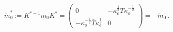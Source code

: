 \begin{equation}
\tilde{m}_{0}^{\ast }:=K^{\ast -1}m_{0}K^{\ast }=\left( 
\begin{array}{cc}
0 & -\kappa _{e}^{\frac{1}{2}}T\kappa _{o}^{-{\frac{1}{2}}} \\ 
-\kappa _{o}^{-{\frac{1}{2}}}\bar{T}\kappa _{e}^{\frac{1}{2}} & 0
\end{array}
\right) =-\tilde{m}_{0}\,.  \label{eq:tilm0}
\end{equation}

